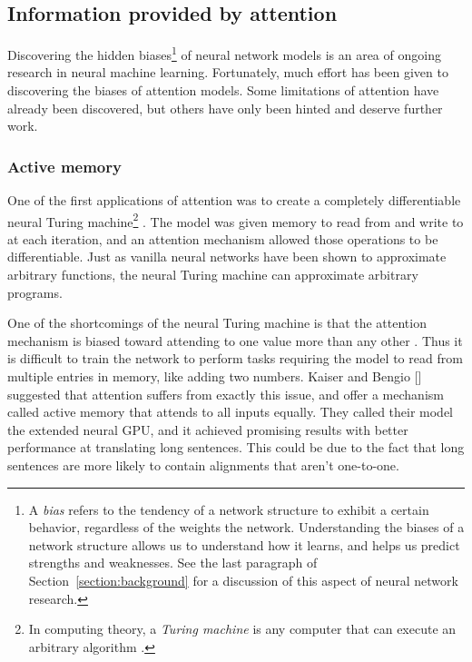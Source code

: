 \documentclass{article}
\begin{document}
\subsection{Information provided by attention}

Discovering the hidden biases\footnote{A \textit{bias} refers to the tendency of a network structure to exhibit a certain behavior, regardless of the weights the network. Understanding the biases of a network structure allows us to understand how it learns, and helps us predict strengths and weaknesses. See the last paragraph of Section~\ref{section:background} for a discussion of this aspect of neural network research.} of neural network models is an area of ongoing research in neural machine learning. Fortunately, much effort has been given to discovering the biases of attention models. Some limitations of attention have already been discovered, but others have only been hinted and deserve further work.

\subsubsection{Active memory}

One of the first applications of attention was to create a completely differentiable neural Turing machine\footnote{In computing theory, a \textit{Turing machine} is any computer that can execute an arbitrary algorithm \cite{wiki:turing}.} \cite{neural_turing}. The model was given memory to read from and write to at each iteration, and an attention mechanism allowed those operations to be differentiable. Just as vanilla neural networks have been shown to approximate arbitrary functions, the neural Turing machine can approximate arbitrary programs.

One of the shortcomings of the neural Turing machine is that the attention mechanism is biased toward attending to one value more than any other \cite{active_memory}. Thus it is difficult to train the network to perform tasks requiring the model to read from multiple entries in memory, like adding two numbers. Kaiser and Bengio [\citeyear{active_memory}] suggested that attention suffers from exactly this issue, and offer a mechanism called active memory that attends to all inputs equally. They called their model the extended neural GPU, and it achieved promising results with better performance at translating long sentences. This could be due to the fact that long sentences are more likely to contain alignments that aren't one-to-one.
\end{document}
